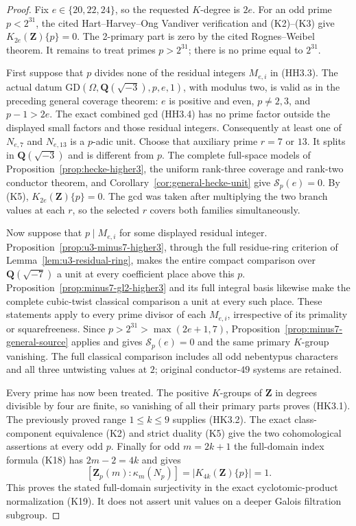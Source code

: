 \documentclass[11pt,a4paper]{article}
\theoremstyle{definition}
\begin{document}
\begin{proof}
Fix $e\in\{20,22,24\}$, so the requested $K$-degree is $2e$.
For an odd prime $p<2^{31}$, the cited Hart--Harvey--Ong
Vandiver verification and (K2)--(K3) give
$K_{2e}(\mathbf Z)\{p\}=0$. The 2-primary part is zero by
the cited Rognes--Weibel theorem. It remains to treat
primes $p>2^{31}$; there is no prime equal to $2^{31}$.

First suppose that $p$ divides none of the residual integers
$M_{e,i}$ in (HH3.3). The actual datum
$\mathrm{GD}(\Omega,\mathbf Q(\sqrt{-3}),p,e,1)$, with
modulus two, is valid as in the preceding general coverage
theorem: $e$ is positive and even, $p\ne2,3$, and $p-1>2e$.
The exact combined gcd (HH3.4) has no prime factor outside
the displayed small factors and those residual integers.
Consequently at least one of $N_{e,7}$ and $N_{e,13}$ is a
$p$-adic unit. Choose that auxiliary prime $r=7$ or $13$.
It splits in $\mathbf Q(\sqrt{-3})$ and is different from $p$.
The complete full-space models of
Proposition~\ref{prop:hecke-higher3}, the uniform rank-three
coverage and rank-two conductor theorem, and
Corollary~\ref{cor:general-hecke-unit} give
$\mathcal S_p(e)=0$. By (K5),
$K_{2e}(\mathbf Z)\{p\}=0$.
The gcd was taken after multiplying the two branch values
at each $r$, so the selected $r$ covers both families
simultaneously.

Now suppose that $p\mid M_{e,i}$ for some displayed residual
integer. Proposition~\ref{prop:u3-minus7-higher3}, through the
full residue-ring criterion of Lemma~\ref{lem:u3-residual-ring},
makes the entire compact comparison over
$\mathbf Q(\sqrt{-7})$ a unit at every coefficient place
above this $p$. Proposition~\ref{prop:minus7-gl2-higher3}
and its full integral basis likewise make the complete
cubic-twist classical comparison a unit at every such place.
These statements apply to every prime divisor of each
$M_{e,i}$, irrespective of its primality or squarefreeness.
Since $p>2^{31}>\max(2e+1,7)$,
Proposition~\ref{prop:minus7-general-source} applies and gives
$\mathcal S_p(e)=0$ and the same primary $K$-group vanishing.
The full classical comparison includes all odd nebentypus
characters and all three untwisting values at $2$; original
conductor-$49$ systems are retained.

Every prime has now been treated. The positive $K$-groups of
$\mathbf Z$ in degrees divisible by four are finite, so
vanishing of all their primary parts proves (HK3.1).
The previously proved range $1\leq k\leq9$ supplies (HK3.2).
The exact class-component equivalence (K2) and strict duality
(K5) give the two cohomological assertions at every odd $p$.
Finally for odd $m=2k+1$ the full-domain index formula (K18)
has $2m-2=4k$ and gives
\[
 [\mathbf Z_p(m):\kappa_m(N_p)]
          =|K_{4k}(\mathbf Z)\{p\}|=1.
\]
This proves the stated full-domain surjectivity in the exact
cyclotomic-product normalization (K19). It does not assert
unit values on a deeper Galois filtration subgroup.
\end{proof}
\end{document}
